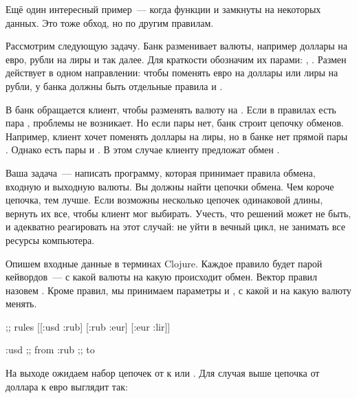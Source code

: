Ещё один интересный пример~--- когда функции  и  замкнуты на
некоторых данных. Это тоже обход, но по другим правилам.


Рассмотрим следующую задачу. Банк разменивает валюты, например доллары на евро,
рубли на лиры и так далее. Для краткости обозначим их парами: ,
. Размен действует в одном направлении: чтобы поменять евро на
доллары или лиры на рубли, у банка должны быть отдельные правила  и
.

В банк обращается клиент, чтобы разменять валюту  на . Если в правилах
есть пара , проблемы не возникает. Но если пары нет, банк строит цепочку
обменов. Например, клиент хочет поменять доллары на лиры, но в банке нет прямой
пары . Однако есть пары  и . В этом случае
клиенту предложат обмен  \arr {} \arr {}.

Ваша задача~--- написать программу, которая принимает правила обмена, входную и
выходную валюты. Вы должны найти цепочки обмена. Чем короче цепочка, тем
лучше. Если возможны несколько цепочек одинаковой длины, вернуть их все, чтобы
клиент мог выбирать. Учесть, что решений может не быть, и адекватно реагировать
на этот случай: не уйти в вечный цикл, не занимать все ресурсы компьютера.

Опишем входные данные в терминах Clojure. Каждое правило будет парой
кейвордов~--- с какой валюты на какую происходит обмен. Вектор правил назовем
. Кроме правил, мы принимаем параметры  и , с
какой и на какую валюту менять.

\begin{english}
  \begin{clojure}
;; rules
[[:usd :rub] [:rub :eur] [:eur :lir]]

:usd ;; from
:rub ;; to
  \end{clojure}
\end{english}

На выходе ожидаем набор цепочек от  к  или . Для случая выше
цепочка от доллара к евро выглядит так:

\begin{english}
  \begin{clojure}
  \end{clojure}
\end{english}

